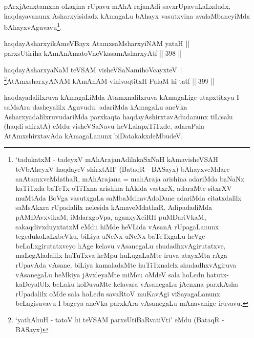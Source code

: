 \begin{artha}
pArxjAcnxtamxna oLagina rUpavu mAhA rajanAdi savxrUpavuLaLxdudx,
haqdayavanunx Asharxyisidadx kAmagaLu bAhayx vasutxvina
avalaMbaneyiMda bAhayxvAguvavu\footnote{`tadukatxM - tadeyxV mAhArajanAdilakaSxNaH kAmavisheVSAH teVbAheyxV haqdayeV shirxtAH' (BataqR - BASayx) bAhayxveMdare anAtamxveMdathaR, mAhArajana = mahAraja arishina adariMda baNaNx kaTiTxda baTeTx oTiTxna arishina hAkida vastxrX, adaraMte sitxrXV muMtAda BoVga vasutxgaLa saMbaMdhavAdoDane adariMda
citatxdalilx saMsAkxra rUpadalilx nelesida kAmaveMdathaR,
AdipadadiMda pAMDAvxvikaM, iMdarxgoVpa, aganxyXciRH puMDariVkaM,
sakaqdivxduyxtatxM eMdu hiMde heVLida vAsanA rUpagaLanunx
tegedukoLaLxbeVku, biLiya uNeNx uNeNx baTeTxgaLu heVge
beLaLxgirutatxveyo hAge kelavu vAsanegaLu shudadhxvAgirutatxve,
maLegAladalilx huTuTxva keMpu huLugaLaMte iruva atayxMta rAga
rUpavAda vAsane, biLiya kamaladaMte huTiTxnalelx shudadhxvAgiruva
vAsanegaLu beMkiya jAvxleyaMte miMcu oMdeV sala hoLedu
hatutx-kaDeyalUlx beLaku koDuvaMte kelavara vAsanegaLu jAcnxna
parxkAsha rUpadalilx oMde sala hoLedu savaRtoV muKavAgi
viSayagaLanunx beLagisuvavu I bageya aneVka parxkAra vAsanegaLu
mAnavanige iruvavu.}.
\end{artha}


\begin{shl}
haqdayAsharxyikAmeVBayx AtamxsaMsharxyiNAM yataH || \\
parxsUtiriha kAmAnAmatoV\s neVkasamAsharxyAtf \hfill || 398 ||  
\end{shl}

\begin{shl}
haqdayAsharxyaNaM teVSAM visheVSaNamihoVcayxteV || \\
\footnote{`yathA\s \s huH - tatoV hi teVSAM parxsUtiBaRvatiVti' eMdu (BataqR - BASayx)}AtAmxsharxyANAM kAmAnAM vinivaqtitxH PalaM hi tatf \hfill || 399 ||  
\end{shl}


\begin{artha} 
haqdayadalilxruva kAmagaLiMda Atamxnalilxruva kAmagaLige
utapxtitxyu I saMsAra dasheyalilx Aguvudu. adariMda kAmagaLu aneVka
AsharxyadalilxruvudariMda parxkaqta haqdayAshirxtavAdudanunx tiLisalu
(haqdi shirxtA) eMdu visheVSaNavu heVLalapxTiTxde, adaraPala
AtAmxshirxtavAda kAmagaLanunx biDatakakxdeMbudeV.
\end{artha}

